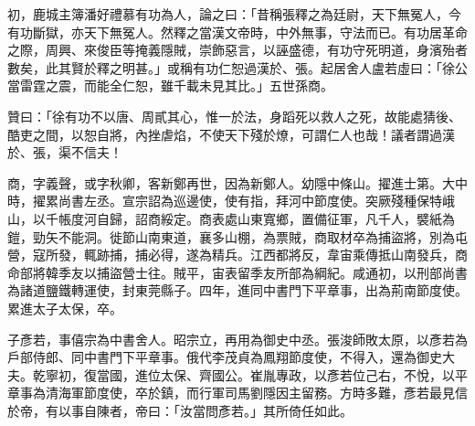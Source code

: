 \begin{pinyinscope}
 初，鹿城主簿潘好禮慕有功為人，論之曰：「昔稱張釋之為廷尉，天下無冤人，今有功斷獄，亦天下無冤人。然釋之當漢文帝時，中外無事，守法而已。有功居革命之際，周興、來俊臣等掩義隱賊，崇飾惡言，以誣盛德，有功守死明道，身濱殆者數矣，此其賢於釋之明甚。」或稱有功仁恕過漢於、張。起居舍人盧若虛曰：「徐公當雷霆之震，而能全仁恕，雖千載未見其比。」五世孫商。



 贊曰：「徐有功不以唐、周貳其心，惟一於法，身蹈死以救人之死，故能處猜後、酷吏之間，以恕自將，內挫虐焰，不使天下殘於燎，可謂仁人也哉！議者謂過漢於、張，渠不信夫！



 商，字義聲，或字秋卿，客新鄭再世，因為新鄭人。幼隱中條山。擢進士第。大中時，擢累尚書左丞。宣宗詔為巡邊使，使有指，拜河中節度使。突厥殘種保特峨山，以千帳度河自歸，詔商綏定。商表處山東寬鄉，置備征軍，凡千人，襞紙為鎧，勁矢不能洞。徙節山南東道，襄多山棚，為票賊，商取材卒為捕盜將，別為屯營，寇所發，輒跡捕，捕必得，遂為精兵。江西都將反，韋宙乘傳抵山南發兵，商命部將韓季友以捕盜營士往。賊平，宙表留季友所部為綱紀。咸通初，以刑部尚書為諸道鹽鐵轉運使，封東莞縣子。四年，進同中書門下平章事，出為荊南節度使。累進太子太保，卒。



 子彥若，事僖宗為中書舍人。昭宗立，再用為御史中丞。張浚師敗太原，以彥若為戶部侍郎、同中書門下平章事。俄代李茂貞為鳳翔節度使，不得入，還為御史大夫。乾寧初，復當國，進位太保、齊國公。崔胤專政，以彥若位己右，不悅，以平章事為清海軍節度使，卒於鎮，而行軍司馬劉隱因主留務。方時多難，彥若最見信於帝，有以事自陳者，帝曰：「汝當問彥若。」其所倚任如此。



\end{pinyinscope}